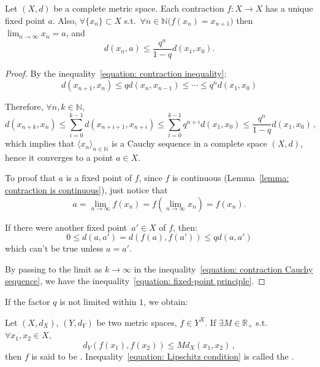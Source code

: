 \documentclass[openany]{book}
\begin{document}
\begin{theorem}
		\label{theorem: Picard-Banach}%
	Let $(X, d)$ be a complete metric space. 
	Each contraction $f \colon X \to X$ has a unique fixed point $a$. 
	Also, $\forall \{x_n\} \subset X$ s.t.\ 
	$\forall n \in \mathbb{N} \big(f (x_n) = x_{n+1} \big)$ then $\lim_{n\to \infty} x_n = a$, and
	\begin{equation}\label{equation: fixed-point principle}
		d(x_n, a) \leq \frac{q^n}{1 - q} d(x_1, x_0).
\end{equation}
\end{theorem}
\begin{proof}
	By the inequality~\ref{equation: contraction inequality}:
	\[
		d(x_{n+1}, x_n) \leq q d(x_n, x_{n-1})
		\leq \cdots 
		\leq q^n d(x_1, x_0)
	\]

	Therefore, $\forall n, k \in \mathbb{N}$, 
	\begin{equation}\label{equation: contraction Cauchy sequence}
		d(x_{n+k}, x_n) \leq 
			\sum^{k-1}_{i=0} d(x_{n+i+1}, x_{n+i}) \leq
			\sum^{k-1}_{i=0} q^{n+i} d(x_1, x_0) \leq
			\frac{q^n}{1 - q} d(x_1, x_0) \,,
	\end{equation}
	which implies that $\langle x_n \rangle_{n \in \mathbb N}$ is a Cauchy sequence in a complete space $(X, d)$, hence it converges to a point $a \in X$.

	To proof that $a$ is a fixed point of $f$, since $f$ is continuous (Lemma~\ref{lemma: contraction is continuous}), just notice that 
	\[
		a = \lim_{n \to \infty} f(x_n) 
			= f(\lim_{n\to \infty} x_n) = f(x_n).
	\]

	If there were another fixed point~$a' \in X$ of $f$, then:
	\[
		0 \leq d(a, a')  = d(f(a), f(a')) \leq q d(a, a')
	\]
	which can't be true unless $a = a'$. 

	By passing to the limit as $k \to \infty$ in the inequality~\ref{equation: contraction Cauchy sequence}, we have the inequality~\ref{equation: fixed-point principle}.
\end{proof}

If the factor $q$ is not limited within $1$, we obtain:
\begin{definition}
	Let $(X, d_X)$, $(Y, d_Y)$ be two metric spaces, $f \in Y^X$. If $\exists M \in \mathbb R_+$ s.t.\ $\forall x_1, x_2 \in X$, 
	\begin{equation}\label{equation: Lipschitz condition}
		d_Y(f(x_1), f(x_2)) \leq M d_X(x_1, x_2)\,,
	\end{equation}
	then $f$ is said to be . 
	Inequality~\ref{equation: Lipschitz condition} is called the .
\end{definition}
\end{document}
